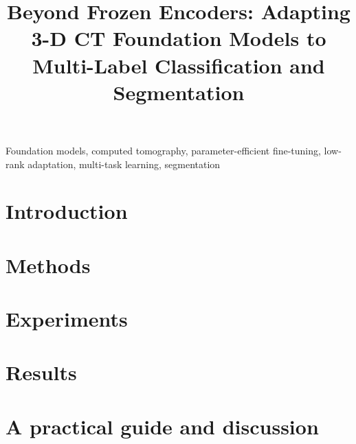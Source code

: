 \documentclass{midl}
\title[Beyond frozen encoders]{Beyond Frozen Encoders: Adapting 3-D CT Foundation Models to Multi-Label Classification and Segmentation}
\begin{document}
\maketitle

\begin{abstract}

\end{abstract}

\begin{keywords}
Foundation models, computed tomography, parameter-efficient fine-tuning, low-rank adaptation, multi-task learning, segmentation
\end{keywords}

\section{Introduction}
\label{sec:intro}


\section{Methods}
\label{sec:methods}


\section{Experiments}
\label{sec:setup}


\section{Results}
\label{sec:results}


\section{A practical guide and discussion}
\label{sec:discussion}\label{sec:guide}


\clearpage


\appendix

\end{document}
